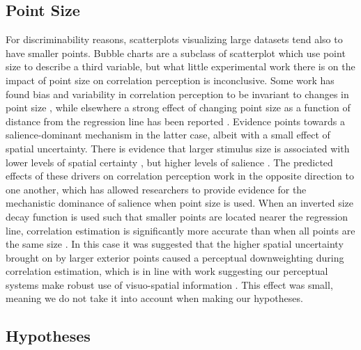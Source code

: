 \documentclass[manuscript, review, anonymous, screen]{acmart}
\begin{document}
\hypertarget{sec-point-size}{%
\subsection{Point Size}\label{sec-point-size}}

For discriminability reasons, scatterplots visualizing large datasets
tend also to have smaller points. Bubble charts are a subclass of
scatterplot which use point size to describe a third variable, but what
little experimental work there is on the impact of point size on
correlation perception is inconclusive. Some work has found bias and
variability in correlation perception to be invariant to changes in
point size \citep{rensink_2012, rensink_2014}, while elsewhere a strong
effect of changing point size as a function of distance from the
regression line has been reported \citep{strain_2023b}. Evidence points
towards a salience-dominant mechanism in the latter case, albeit with a
small effect of spatial uncertainty. There is evidence that larger
stimulus size is associated with lower levels of spatial certainty
\citep{alais_2004}, but higher levels of salience \citep{healey_2011}.
The predicted effects of these drivers on correlation perception work in
the opposite direction to one another, which has allowed researchers to
provide evidence for the mechanistic dominance of salience when point
size is used. When an inverted size decay function is used such that
smaller points are located nearer the regression line, correlation
estimation is significantly more accurate than when all points are the
same size \citep{strain_2023b}. In this case it was suggested that the
higher spatial uncertainty brought on by larger exterior points caused a
perceptual downweighting during correlation estimation, which is in line
with work suggesting our perceptual systems make robust use of
visuo-spatial information
\citep{strain_2023b, warren_2002, warren_2004}. This effect was small,
meaning we do not take it into account when making our hypotheses.

\hypertarget{hypotheses}{%
\subsection{Hypotheses}\label{hypotheses}}
\end{document}
